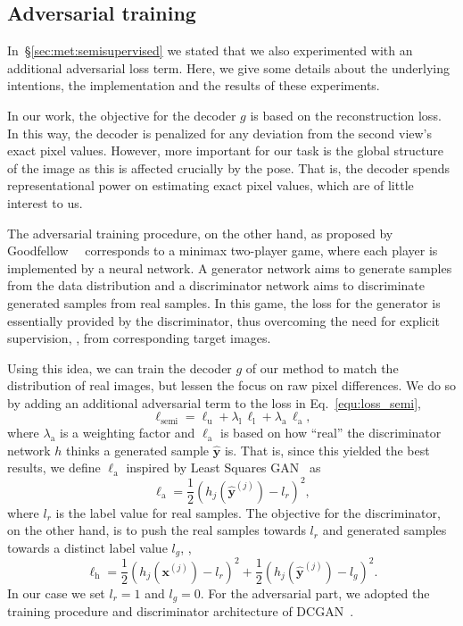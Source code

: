 \documentclass[10pt,twocolumn,letterpaper]{article}
\begin{document}
\subsection{Adversarial training}\label{sup:sec:adversarial}
In~\S\ref{sec:met:semisupervised} we stated that we also experimented with an 
additional adversarial loss term. 
Here, we give some details about the underlying intentions, 
the implementation and the results of these experiments.

In our work, the objective for the decoder $g$ is based on the reconstruction loss.
In this way, the decoder is penalized for any deviation 
from the second view's exact pixel values.
However, more important for our task is the global structure of the image
as this is affected crucially by the pose.
That is, the decoder spends representational power on estimating exact pixel values,  
which are of little interest to us.

The adversarial training procedure, on the other hand, 
as proposed by Goodfellow~\etal~\cite{Goodfellow2014nips_gan}
corresponds to a minimax two-player game, where each player is implemented by a neural network.
A generator network aims to generate samples from the data distribution and a 
discriminator network aims to discriminate generated samples from real samples.
In this game, the loss for the generator is essentially provided by the discriminator,
thus overcoming the need for explicit supervision, \eg, from corresponding target images.

Using this idea, we can train the decoder $g$ of our method to match the distribution of 
real images, but lessen the focus on raw pixel differences. %
We do so by adding an additional adversarial term 
to the loss in Eq.~\eqref{equ:loss_semi},
\begin{equation}
  \ell_{\mathrm{semi}} = \ell_{\mathrm{u}} + \lambda_{\mathrm{l}} \, \ell_{\mathrm{l}}
			+ \lambda_{\mathrm{a}} \, \ell_{\mathrm{a}},
\end{equation}
where $\lambda_{\mathrm{a}}$ is a weighting factor and 
$\ell_{\mathrm{a}}$ is based on how ``real'' the discriminator network $h$ 
thinks a generated sample $\mathbf{\hat{y}}$ is.
That is, since this yielded the best results,
we define $\ell_{\mathrm{a}}$ inspired by Least Squares GAN~\cite{Mao2017iccv_lsgan} as
\begin{equation}
 \ell_{\mathrm{a}} = \frac{1}{2} \left( h_{j} ( \mathbf{\hat{y}}^{(j)} ) - l_{r} \right)^{2},
\end{equation}
where $l_{r}$ is the label value for real samples.
The objective for the discriminator, on the other hand, is to push 
the real samples towards $l_{r}$ and 
generated samples towards a distinct label value $l_{g}$, \ie,
\begin{equation}
 \ell_{\mathrm{h}} = \frac{1}{2} \left( h_{j} ( \mathbf{x}^{(j)} ) - l_{r} \right)^{2}
		   + \frac{1}{2} \left( h_{j} ( \mathbf{\hat{y}}^{(j)} ) - l_{g} \right)^{2}.
\end{equation}
In our case we set $l_{r} = 1$ and $l_{g} = 0$.
For the adversarial part, we adopted the training procedure and discriminator architecture of 
DCGAN~\cite{Radford2016iclr_dcgan}.
\end{document}

